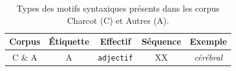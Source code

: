 \begin{table}[h]
	\centering
	\begin{tabular}{|c|c|c|c|c|}
		\hline\hline
	\multicolumn{1}{|c|}{Corpus} & Étiquette & Effectif	& Séquence & Exemple \\
		\hline
	\multicolumn{1}{|c|}{C \& A} & \multicolumn{1}{|c|}{\textsc{A}}	& \multicolumn{1}{|c|}{\texttt{adjectif}} & XX & \multicolumn{1}{|c|}{\textit{cérébral}} \\
	\end{tabular}
	\caption{Types des motifs syntaxiques présents dans les corpus \og{}Charcot\fg{} (\textsc{C}) et \og{}Autres\fg{} (\textsc{A}).}
	\label{tab:types_motifs_POS}
\end{table}



